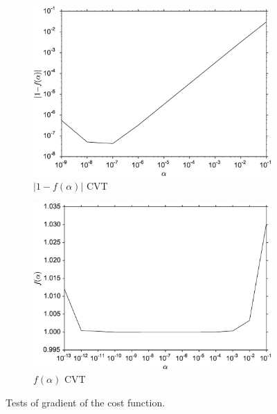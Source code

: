 \documentclass[11pt]{article}
\begin{document}
\begin{figure}
\begin{subfigure}[b]{0.49\textwidth}
        \includegraphics[width=\textwidth]{cost_cvt.eps}
        \caption{$|1-f(\alpha)|$ CVT}
        \label{fig:4dvarBcorR}
    \end{subfigure}
    \begin{subfigure}[b]{0.49\textwidth}
        \includegraphics[width=\textwidth]{costone_cvt.eps}
        \caption{$f(\alpha)$ CVT}
        \label{fig:4dvaredcBcorR}
    \end{subfigure}
    \caption{Tests of gradient of the cost function.}\label{fig:4dvar}
\end{figure}
\end{document}
